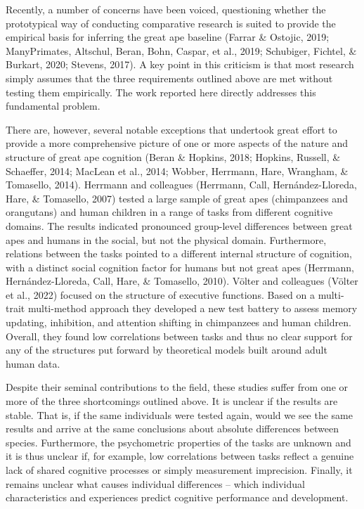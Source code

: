 \documentclass[
  man,floatsintext]{apa6}
\begin{document}
Recently, a number of concerns have been voiced, questioning whether the prototypical way of conducting comparative research is suited to provide the empirical basis for inferring the great ape baseline (Farrar \& Ostojic, 2019; ManyPrimates, Altschul, Beran, Bohn, Caspar, et al., 2019; Schubiger, Fichtel, \& Burkart, 2020; Stevens, 2017). A key point in this criticism is that most research simply assumes that the three requirements outlined above are met without testing them empirically. The work reported here directly addresses this fundamental problem.

There are, however, several notable exceptions that undertook great effort to provide a more comprehensive picture of one or more aspects of the nature and structure of great ape cognition (Beran \& Hopkins, 2018; Hopkins, Russell, \& Schaeffer, 2014; MacLean et al., 2014; Wobber, Herrmann, Hare, Wrangham, \& Tomasello, 2014). Herrmann and colleagues (Herrmann, Call, Hernández-Lloreda, Hare, \& Tomasello, 2007) tested a large sample of great apes (chimpanzees and orangutans) and human children in a range of tasks from different cognitive domains. The results indicated pronounced group-level differences between great apes and humans in the social, but not the physical domain. Furthermore, relations between the tasks pointed to a different internal structure of cognition, with a distinct social cognition factor for humans but not great apes (Herrmann, Hernández-Lloreda, Call, Hare, \& Tomasello, 2010). Völter and colleagues (Völter et al., 2022) focused on the structure of executive functions. Based on a multi-trait multi-method approach they developed a new test battery to assess memory updating, inhibition, and attention shifting in chimpanzees and human children. Overall, they found low correlations between tasks and thus no clear support for any of the structures put forward by theoretical models built around adult human data.

Despite their seminal contributions to the field, these studies suffer from one or more of the three shortcomings outlined above. It is unclear if the results are stable. That is, if the same individuals were tested again, would we see the same results and arrive at the same conclusions about absolute differences between species. Furthermore, the psychometric properties of the tasks are unknown and it is thus unclear if, for example, low correlations between tasks reflect a genuine lack of shared cognitive processes or simply measurement imprecision. Finally, it remains unclear what causes individual differences -- which individual characteristics and experiences predict cognitive performance and development.
\end{document}
